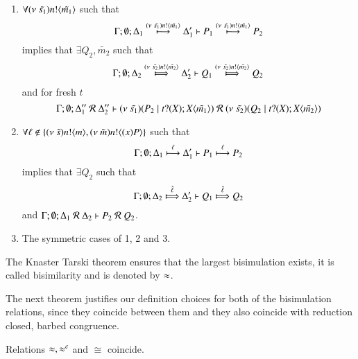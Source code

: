 \begin{definition}[Bisimulation]
\begin{enumerate}
		\item	$\forall (\nu\ \tilde{s_1}) n ! \langle \tilde{m_1} \rangle$ such that
			\[
				\Gamma; \emptyset; \Delta_1 \stackrel{(\nu\ \tilde{s_1}) n ! \langle \tilde{m_1} \rangle}{\longmapsto} \Delta_1' \vdash P_1 \stackrel{(\nu\ \tilde{s_1}) n ! \langle \tilde{m_1} \rangle}{\longmapsto} P_2
			\]
			implies that $\exists Q_2, \tilde{m_2}$ such that
			\[
				\Gamma; \emptyset; \Delta_2 \Hby{\news{\tilde{s_2}} \bactout{n}{\tilde{m_2}}} \Delta_2' \proves Q_1 \Hby{\news{\tilde{s_2}} \bactout{n}{\tilde{m_2}}} Q_2
			\]
			and for fresh $t$
			\[
				\Gamma; \emptyset; \Delta_1''\ \mathcal{R}\ \Delta_2'' \proves
				\newsp{\tilde{s_1}}{P_2 \Par \nametrigger{t}{\tilde{m_1}}}  %
				\ \mathcal{R}\ 
				\newsp{\tilde{s_2}}{Q_2 \Par \nametrigger{t}{\tilde{m_2}}} %
			\]

		\item	$\forall \ell \notin \{(\nu\ \tilde{s}) n ! \langle m \rangle, (\nu\ \tilde{m}) n ! \langle (x)P \rangle\}$ such that
			\[
				\Gamma; \emptyset; \Delta_1 \stackrel{\ell}{\longmapsto} \Delta_1' \vdash P_1 \stackrel{\ell}{\longmapsto} P_2
			\]
			implies that $\exists Q_2$ such that 
			\[
				\Gamma; \emptyset; \Delta_2 \Hby{\hat{\ell}} \Delta_2' \proves Q_1 \Hby{\hat{\ell}} Q_2
			\]
			and
			$\Gamma; \emptyset; \Delta_1\ \mathcal{R}\ \Delta_2 \vdash P_2\ \mathcal{R}\ Q_2$.

		\item	The symmetric cases of 1, 2 and 3.
	\end{enumerate}
	The Knaster Tarski theorem ensures that the largest bisimulation exists, it is called bisimilarity and is denoted by $\approx$.
\end{definition}

The next theorem justifies our definition choices
for both of the bisimulation relations, since
they coincide between them and they also
coincide with reduction closed, barbed congruence.

\begin{theorem}[Coincidence]\rm
	\label{the:coincidence}
	Relations $\approx, \approx^{c}$ and $\cong$ coincide.
\end{theorem}

